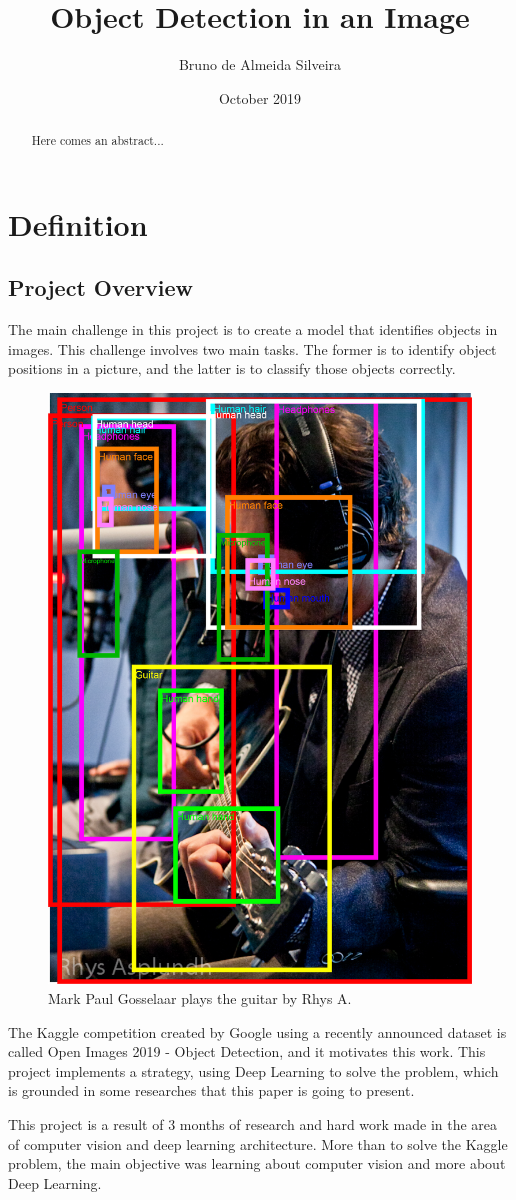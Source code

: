 \documentclass[11pt, a4paper, twocolumn]{article}
\title{\textbf{Object Detection in an Image}}
\author{Bruno de Almeida Silveira}
\date{October 2019}
\begin{document}
\begin{titlingpage}
	\maketitle
	\begin{abstract}
		Here comes an abstract...
	\end{abstract}
\end{titlingpage}

\section{Definition}
\subsection{Project Overview}
The main challenge in this project is to create a model that identifies objects in images. This challenge involves two main tasks. The former is to identify object positions in a picture, and the latter is to classify those objects correctly. 

\begin{figure}[ht]
	\centering
	\includegraphics[width=.4\textwidth]{intro-1.png}
	\caption{\scriptsize Mark Paul Gosselaar plays the guitar by Rhys A. \cite{google:1}}
\end{figure}

The Kaggle competition created by Google \cite{kaggle} using a recently announced dataset is called Open Images 2019 - Object Detection\cite{google:1}, and it motivates this work. This project implements a strategy, using Deep Learning to solve the problem, which is grounded in some researches that this paper is going to present.

This project is a result of 3 months of research and hard work made in the area of computer vision and deep learning architecture. More than to solve the Kaggle problem, the main objective was learning about computer vision and more about Deep Learning.
\end{document}
